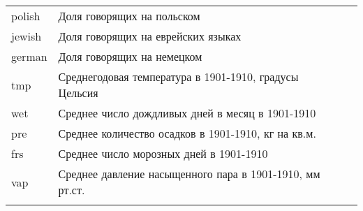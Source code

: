 \begin{longtable}{p{} p{} p{}}
	polish         & Доля говорящих на польском                                   &                                  \\
	jewish         & Доля говорящих на еврейских языках                           &                                  \\
	german         & Доля говорящих на немецком                                   &                                  \\
	tmp            & Среднегодовая температура в 1901-1910, градусы Цельсия       & \cite{harris_version_2020}       \\
	wet            & Среднее число дождливых дней в месяц в 1901-1910             &                                  \\
	pre            & Среднее количество осадков в 1901-1910, кг на кв.м.          &                                  \\
	frs            & Среднее число морозных дней в 1901-1910                      &                                  \\
	vap            & Среднее давление насыщенного пара в 1901-1910, мм рт.ст.     &                                  \\* \bottomrule
	\label{table:vars}
\end{longtable}